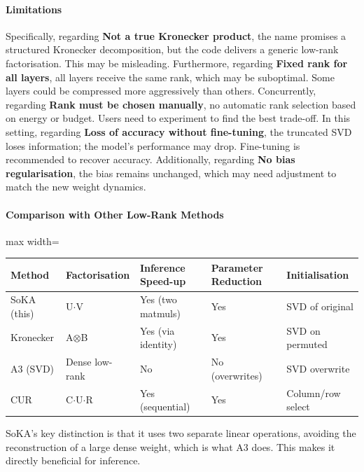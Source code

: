 \paragraph{Limitations}

Specifically, regarding \textbf{Not a true Kronecker product}, the name promises a structured Kronecker decomposition, but the code delivers a generic low-rank factorisation. This may be misleading. Furthermore, regarding \textbf{Fixed rank for all layers}, all layers receive the same rank, which may be suboptimal. Some layers could be compressed more aggressively than others. Concurrently, regarding \textbf{Rank must be chosen manually}, no automatic rank selection based on energy or budget. Users need to experiment to find the best trade-off. In this setting, regarding \textbf{Loss of accuracy without fine-tuning}, the truncated SVD loses information; the model's performance may drop. Fine-tuning is recommended to recover accuracy. Additionally, regarding \textbf{No bias regularisation}, the bias remains unchanged, which may need adjustment to match the new weight dynamics.


\paragraph{Comparison with Other Low-Rank Methods}

\begin{center}
\begin{adjustbox}{max width=\columnwidth}
\renewcommand{\arraystretch}{1.2}
\begin{tabular}{lllll}
\toprule
Method & Factorisation & Inference Speed-up & Parameter Reduction & Initialisation \\
\midrule
SoKA (this) & U$\cdot$V & Yes (two matmuls) & Yes & SVD of original \\
Kronecker & A$\otimes$B & Yes (via identity) & Yes & SVD on permuted \\
A3 (SVD) & Dense low-rank & No & No (overwrites) & SVD overwrite \\
CUR & C$\cdot$U$\cdot$R & Yes (sequential) & Yes & Column/row select \\

\bottomrule
\end{tabular}
\end{adjustbox}
\end{center}
SoKA's key distinction is that it uses two separate linear operations, avoiding the reconstruction of a large dense weight, which is what A3 does. This makes it directly beneficial for inference.


